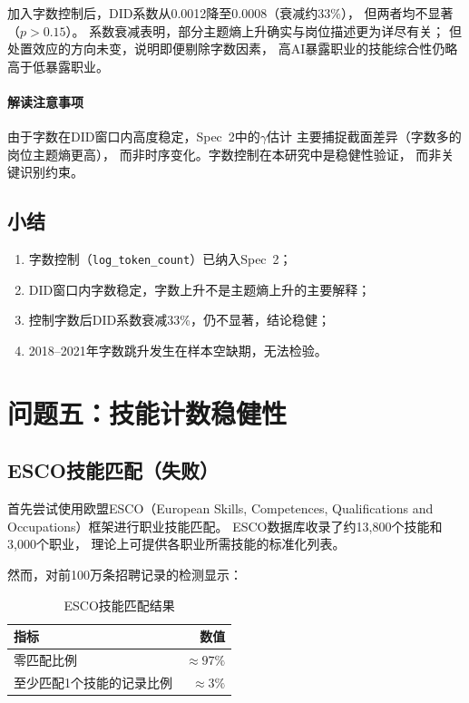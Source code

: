 \documentclass[12pt,a4paper]{ctexart}
\begin{document}
加入字数控制后，DID系数从0.0012降至0.0008（衰减约33\%），
但两者均不显著（$p>0.15$）。
系数衰减表明，部分主题熵上升确实与岗位描述更为详尽有关；
但处置效应的方向未变，说明即便剔除字数因素，
高AI暴露职业的技能综合性仍略高于低暴露职业。

\paragraph{解读注意事项}
由于字数在DID窗口内高度稳定，Spec~2中的$\gamma$估计
主要捕捉截面差异（字数多的岗位主题熵更高），
而非时序变化。字数控制在本研究中是稳健性验证，
而非关键识别约束。

\subsection{小结}

\begin{enumerate}
\item 字数控制（\texttt{log\_token\_count}）已纳入Spec~2；
\item DID窗口内字数稳定，字数上升不是主题熵上升的主要解释；
\item 控制字数后DID系数衰减33\%，仍不显著，结论稳健；
\item 2018--2021年字数跳升发生在样本空缺期，无法检验。
\end{enumerate}


\section{问题五：技能计数稳健性}
\label{sec:skill_count}

\subsection{ESCO技能匹配（失败）}

首先尝试使用欧盟ESCO（European Skills, Competences, Qualifications
and Occupations）框架进行职业技能匹配。
ESCO数据库收录了约13,800个技能和3,000个职业，
理论上可提供各职业所需技能的标准化列表。

然而，对前100万条招聘记录的检测显示：

\begin{table}[h!]
\centering
\caption{ESCO技能匹配结果}
\label{tab:esco_match}
\begin{tabular}{lr}
\toprule
指标 & 数值 \\
\midrule
零匹配比例 & $\approx 97\%$ \\
至少匹配1个技能的记录比例 & $\approx 3\%$ \\
\bottomrule
\end{tabular}
\end{table}
\end{document}

